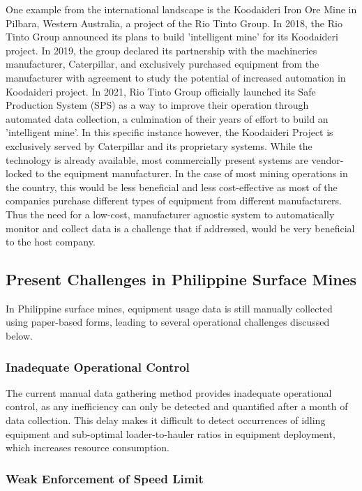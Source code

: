 \documentclass[12pt]{report}
\begin{document}
One example from the international landscape is the Koodaideri Iron Ore Mine in Pilbara, Western Australia, a project of the Rio Tinto Group.
In 2018, the Rio Tinto Group announced its plans to build 'intelligent mine' for its Koodaideri project\cite{koodaideri1}.
In 2019, the group declared its partnership with the machineries manufacturer, Caterpillar, and exclusively purchased equipment from the manufacturer with agreement to study the potential of increased automation in Koodaideri project\cite{koodaideri2}.
In 2021, Rio Tinto Group officially launched its Safe Production System (SPS) as a way to improve their operation through automated data collection\cite{sps}, a culmination of their years of effort to build an 'intelligent mine'.
In this specific instance however, the Koodaideri Project is exclusively served by Caterpillar and its proprietary systems.
While the technology is already available, most commercially present systems are vendor-locked to the equipment manufacturer.
In the case of most mining operations in the country, this would be less beneficial and less cost-effective as most of the companies purchase different types of equipment from different manufacturers.
Thus the need for a low-cost, manufacturer agnostic system to automatically monitor and collect data is a challenge that if addressed, would be very beneficial to the host company.

\subsection{Present Challenges in Philippine Surface Mines}

In Philippine surface mines, equipment usage data is still manually collected using paper-based forms, leading to several operational challenges discussed below.

\subsubsection{Inadequate Operational Control}

The current manual data gathering method provides inadequate operational control, as any inefficiency can only be detected and quantified after a month of data collection.
This delay makes it difficult to detect occurrences of idling equipment and sub-optimal loader-to-hauler ratios in equipment deployment, which increases resource consumption.

\subsubsection{Weak Enforcement of Speed Limit}
\end{document}
